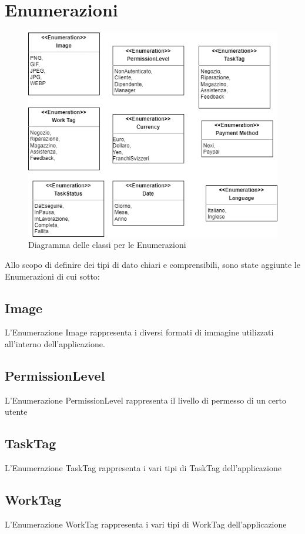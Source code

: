 \documentclass{report}
\begin{document}
\section{Enumerazioni}
\begin{figure}[H]
	\centering\includegraphics[width=1\textwidth]{images/Diagramma_delle_classi_Enumi.png}
	Diagramma delle classi per le Enumerazioni
\end{figure}
Allo scopo di definire dei tipi di dato chiari e comprensibili, sono state aggiunte le Enumerazioni di cui sotto:
\subsection*{Image}
L'Enumerazione Image rappresenta i diversi formati di immagine utilizzati all'interno dell'applicazione.
\subsection*{PermissionLevel}
L'Enumerazione PermissionLevel rappresenta il livello di permesso di un certo utente
\subsection*{TaskTag}
L'Enumerazione TaskTag rappresenta i vari tipi di TaskTag dell'applicazione
\subsection*{WorkTag}
L'Enumerazione WorkTag rappresenta i vari tipi di WorkTag dell'applicazione
\end{document}
